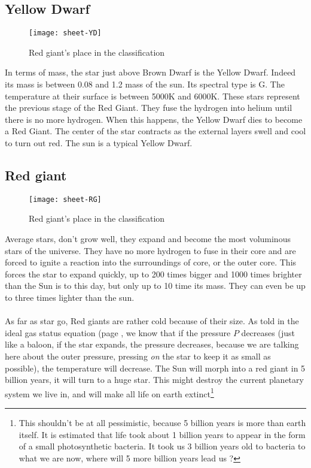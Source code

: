 \documentclass[a4paper, 11pt]{article} %
\begin{document}
\subsection{Yellow Dwarf}

\begin{figure}[h]
\centering
\texttt{[image: sheet-YD]}
\caption{Red giant's place in the classification}
\end{figure}


In terms of mass, the star just above Brown Dwarf is the Yellow Dwarf. Indeed its mass is between 0.08 and 1.2 mass of the sun. Its spectral type is G. The temperature at their surface is between 5000K and 6000K. These stars represent the previous stage of the Red Giant. They fuse the hydrogen into helium until there is no more hydrogen. When this happens, the Yellow Dwarf dies to become a Red Giant. The center of the star contracts as the external layers swell and cool to turn out red. 
The sun is a typical Yellow Dwarf.


\subsection{Red giant}
\begin{figure}[h]
\centering
\texttt{[image: sheet-RG]}
\caption{Red giant's place in the classification}
\end{figure}


Average stars, don't grow well, they expand and become the most voluminous stars of the universe. They have no more hydrogen to fuse in their core and are forced to ignite a reaction into the surroundings of core, or the outer core. This forces the star to expand quickly, up to 200 times bigger and 1000 times brighter than the Sun is to this day, but only up to 10 time its mass. They can even be up to three times lighter than the sun. 

\paragraph*{}
As far as star go, Red giants are rather cold because of their size. As told in the ideal gas status equation (page \pageref{GP}, we know that if the pressure $P$ decreases (just like a baloon, if the star expands, the pressure decreases, because we are talking here about the outer pressure, pressing \textit{on} the star to keep it as small as possible), the temperature will decrease.
The Sun will morph into a red giant in 5 billion years, it will turn to a huge star. This might destroy the current planetary system we live in, and will make all life on earth extinct\footnote{This shouldn't be at all pessimistic, because 5 billion years is more than earth itself. It is estimated that life took about 1 billion years to appear in the form of a small photosynthetic bacteria. It took us 3 billion years old to bacteria to what we are now, where will 5 more billion years lead us ?}
\end{document}
